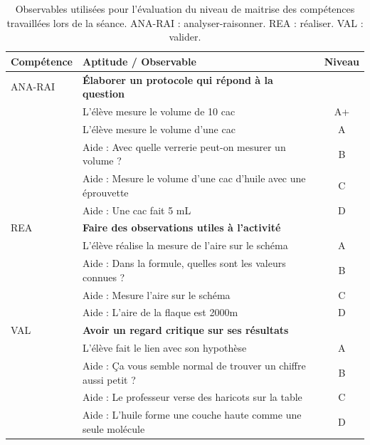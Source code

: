 \documentclass[12pt,a4paper]{article}
\newcommand{\rea}{\colorbox{yellow_c}{\textcolor{yellow_f}{REA}}}
\newcommand{\anarai}{\colorbox{green_c}{\textcolor{green_f}{ANA-RAI}}}
\newcommand{\val}{\colorbox{orange_c}{\textcolor{orange_f}{VAL}}}
\begin{document}
\begin{table}[p]
\center
\begin{tabular}{l|l|c}
\textbf{Compétence} & \textbf{Aptitude} / Observable & \textbf{Niveau} \\
\hline \hline
\anarai 	& \textbf{Élaborer un protocole qui répond à la question} 	& \\
				& L'élève mesure le volume de 10 cac				 						& A+ \\
				& L'élève mesure le volume d'une cac 									& A \\
				& Aide : Avec quelle verrerie peut-on mesurer un volume ?	& B \\
				& Aide : Mesure le volume d'une cac d'huile avec une éprouvette & C \\
				& Aide : Une cac fait 5 mL 															& D \\
\hline
\rea			& \textbf{Faire des observations utiles à l'activité}					& \\
				& L'élève réalise la mesure de l'aire sur le schéma				& A \\
				& Aide : Dans la formule, quelles sont les valeurs connues ? & B \\
				& Aide : Mesure l'aire sur le schéma											& C \\
				& Aide : L'aire de la flaque est \unit{2000}{m\squared}			& D \\
\hline
\val			& \textbf{Avoir un regard critique sur ses résultats}				& \\
				& L'élève fait le lien avec son hypothèse									& A \\
				& Aide : Ça vous semble normal de trouver un chiffre aussi petit ? & B \\
				& Aide : Le professeur verse des haricots sur la table			& C \\
				& Aide : L'huile forme une couche haute comme une seule molécule & D \\
\end{tabular}
\caption{Observables utilisées pour l'évaluation du niveau de maitrise des compétences travaillées lors de la séance.
\anarai{} : analyser-raisonner.
\rea{} : réaliser.
\val{} : valider.}
\label{tab:cptces_tp}
\end{table}
\end{document}
